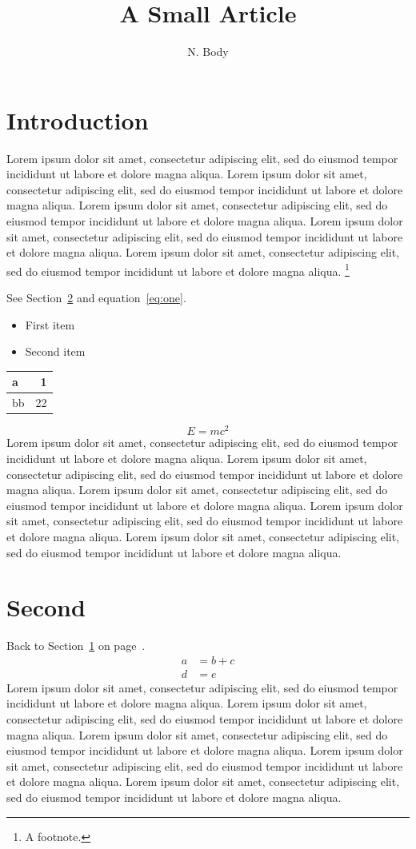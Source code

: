 \documentclass{article}
\title{A Small Article}\author{N. Body}
\begin{document}
\maketitle
\section{Introduction}\label{sec:intro}
Lorem ipsum dolor sit amet, consectetur adipiscing elit, sed do eiusmod tempor incididunt ut labore et dolore magna aliqua. Lorem ipsum dolor sit amet, consectetur adipiscing elit, sed do eiusmod tempor incididunt ut labore et dolore magna aliqua. Lorem ipsum dolor sit amet, consectetur adipiscing elit, sed do eiusmod tempor incididunt ut labore et dolore magna aliqua. Lorem ipsum dolor sit amet, consectetur adipiscing elit, sed do eiusmod tempor incididunt ut labore et dolore magna aliqua. Lorem ipsum dolor sit amet, consectetur adipiscing elit, sed do eiusmod tempor incididunt ut labore et dolore magna aliqua. \footnote{A footnote.}

See Section~\ref{sec:second} and equation~\eqref{eq:one}.
\begin{itemize}\item First item\item Second item\end{itemize}
\begin{tabular}{|l|r|}\hline a & 1\\\hline bb & 22\\\hline\end{tabular}
\begin{equation}\label{eq:one} E=mc^2 \end{equation}
Lorem ipsum dolor sit amet, consectetur adipiscing elit, sed do eiusmod tempor incididunt ut labore et dolore magna aliqua. Lorem ipsum dolor sit amet, consectetur adipiscing elit, sed do eiusmod tempor incididunt ut labore et dolore magna aliqua. Lorem ipsum dolor sit amet, consectetur adipiscing elit, sed do eiusmod tempor incididunt ut labore et dolore magna aliqua. Lorem ipsum dolor sit amet, consectetur adipiscing elit, sed do eiusmod tempor incididunt ut labore et dolore magna aliqua. Lorem ipsum dolor sit amet, consectetur adipiscing elit, sed do eiusmod tempor incididunt ut labore et dolore magna aliqua. 
\newpage
\section{Second}\label{sec:second}
Back to Section~\ref{sec:intro} on page~\pageref{sec:intro}.
\begin{align} a&=b+c\\ d&=e \end{align}
Lorem ipsum dolor sit amet, consectetur adipiscing elit, sed do eiusmod tempor incididunt ut labore et dolore magna aliqua. Lorem ipsum dolor sit amet, consectetur adipiscing elit, sed do eiusmod tempor incididunt ut labore et dolore magna aliqua. Lorem ipsum dolor sit amet, consectetur adipiscing elit, sed do eiusmod tempor incididunt ut labore et dolore magna aliqua. Lorem ipsum dolor sit amet, consectetur adipiscing elit, sed do eiusmod tempor incididunt ut labore et dolore magna aliqua. Lorem ipsum dolor sit amet, consectetur adipiscing elit, sed do eiusmod tempor incididunt ut labore et dolore magna aliqua. 
\end{document}
